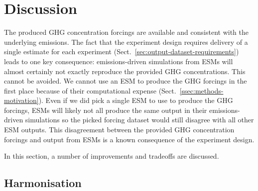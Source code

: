 \section{Discussion}
\label{sec:discussion}

%
%

The produced GHG concentration forcings are available and consistent with the underlying emissions.
The fact that the experiment design requires delivery of a single estimate for each experiment (Sect.~\ref{sec:output-dataset-requirements})
leads to one key consequence: emissions-driven simulations from ESMs will almost certainly not exactly reproduce the provided GHG concentrations.
This cannot be avoided.
We cannot use an ESM to produce the GHG forcings in the first place because of their computational expense (Sect.~\ref{ssec:methods-motivation}).
Even if we did pick a single ESM to use to produce the GHG forcings,
ESMs will likely not all produce the same output in their emissions-driven simulations
so the picked forcing dataset would still disagree with all other ESM outputs.
This disagreement between the provided GHG concentration forcings
and output from ESMs is a known consequence of the experiment design.

In this section, a number of improvements and tradeoffs are discussed.

\subsection{Harmonisation}
\label{ssec:discussion-harmonisation}

